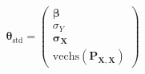 \begin{equation}
	\boldsymbol{\theta}_{\mathrm{std}}
	=
	\left(
	\begin{array}{c}
		\boldsymbol{\beta}                  
		                                    \\
		\sigma_{Y}                          
		                                    \\
		\boldsymbol{\sigma}_{\mathbf{X}}    
		                                    \\
		\mathrm{vechs}                      
		\left(                              
		\mathbf{P}_{\mathbf{X}, \mathbf{X}} 
		\right)                             
	\end{array}
	\right)
\end{equation}
